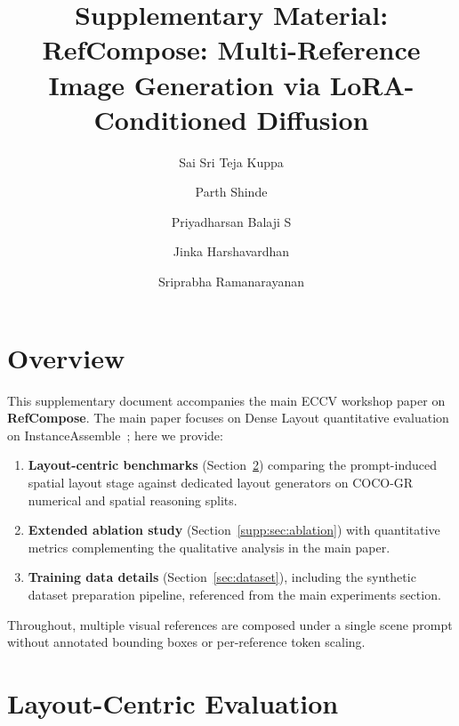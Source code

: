 \title{Supplementary Material:\\RefCompose: Multi-Reference Image Generation via LoRA-Conditioned Diffusion}


\author{Sai Sri Teja Kuppa \and
Parth Shinde \and
Priyadharsan Balaji S \and
Jinka Harshavardhan \and
Sriprabha Ramanarayanan}



\maketitle

\section{Overview}
\label{sec:overview}

This supplementary document accompanies the main ECCV workshop paper on \textbf{RefCompose}.
The main paper focuses on Dense Layout quantitative evaluation on InstanceAssemble~\cite{xiang2025instanceassemble}; here we provide:
\begin{enumerate}
  \item \textbf{Layout-centric benchmarks} (Section~\ref{sec:layout_eval}) comparing the prompt-induced spatial layout stage against dedicated layout generators on COCO-GR~\cite{feng2023layoutgpt} numerical and spatial reasoning splits.
  \item \textbf{Extended ablation study} (Section~\ref{supp:sec:ablation}) with quantitative metrics complementing the qualitative analysis in the main paper.
  \item \textbf{Training data details} (Section~\ref{sec:dataset}), including the synthetic dataset preparation pipeline, referenced from the main experiments section.
\end{enumerate}
Throughout, multiple visual references are composed under a single scene prompt without annotated bounding boxes or per-reference token scaling.

\section{Layout-Centric Evaluation}
\label{sec:layout_eval}

